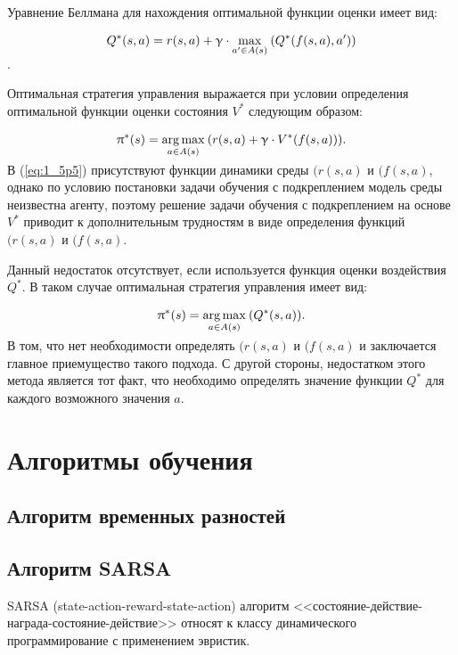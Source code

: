 Уравнение Беллмана для нахождения оптимальной функции оценки имеет вид:

$$ Q^*(s, a) = r(s, a) + \gamma\cdot\smash{\displaystyle\max_{a' \in A(s)}} \: (Q^*(f(s,a),a')) $$.

Оптимальная стратегия управления выражается при условии определения оптимальной функции оценки состояния $ V^* $ следующим образом:

\begin{equation}
\label{eq:1_5p5}
\begin{alignedat}{2}
\pi^*(s) = \smash{\displaystyle\argmax_{a \in A(s)}} \: (r(s, a) + \gamma \cdot V^*(f(s, a))).
\end{alignedat}
\end{equation}

В (\ref{eq:1_5p5}) присутствуют функции динамики среды $ (r(s, a) $ и $ (f(s, a) $, однако по условию постановки задачи обучения с подкреплением модель среды неизвестна агенту, поэтому решение задачи обучения с подкреплением на основе $ V^* $ приводит к дополнительным трудностям в виде определения функций $ (r(s, a) $ и $ (f(s, a) $.

Данный недостаток отсутствует, если используется функция оценки воздействия $ Q^* $. В таком случае оптимальная стратегия управления имеет вид:

\begin{equation}
\label{eq:1_5p6}
\begin{alignedat}{2}
\pi^*(s) = \smash{\displaystyle\argmax_{a \in A(s)}} \: (Q^*(s, a)).
\end{alignedat}
\end{equation}

В том, что нет необходимости определять $ (r(s, a) $ и $ (f(s, a) $ и заключается главное приемущество такого подхода. С другой стороны, недостатком этого метода является тот факт, что необходимо определять значение функции $ Q^* $ для каждого возможного значения $ a $. 

\section{Алгоритмы обучения} \label{sect1_6}

\subsection{Алгоритм временных разностей} \label{subsect1_3_1}

\subsection{Алгоритм SARSA} \label{subsect1_3_2}
SARSA (state-action-reward-state-action) алгоритм <<состояние-действие-награда-состояние-действие>> относят к классу динамического программирование с применением эвристик. 

